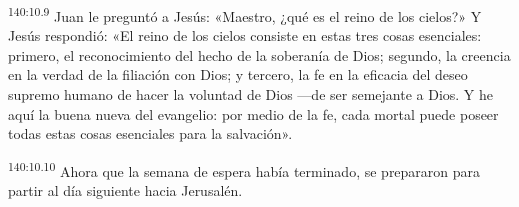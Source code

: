 \par 
\textsuperscript{140:10.9} Juan le preguntó a Jesús: «Maestro, ¿qué es el reino de los cielos?» Y Jesús respondió: «El reino de los cielos consiste en estas tres cosas esenciales: primero, el reconocimiento del hecho de la soberanía de Dios; segundo, la creencia en la verdad de la filiación con Dios; y tercero, la fe en la eficacia del deseo supremo humano de hacer la voluntad de Dios ---de ser semejante a Dios. Y he aquí la buena nueva del evangelio: por medio de la fe, cada mortal puede poseer todas estas cosas esenciales para la salvación».

\par 
\textsuperscript{140:10.10} Ahora que la semana de espera había terminado, se prepararon para partir al día siguiente hacia Jerusalén.